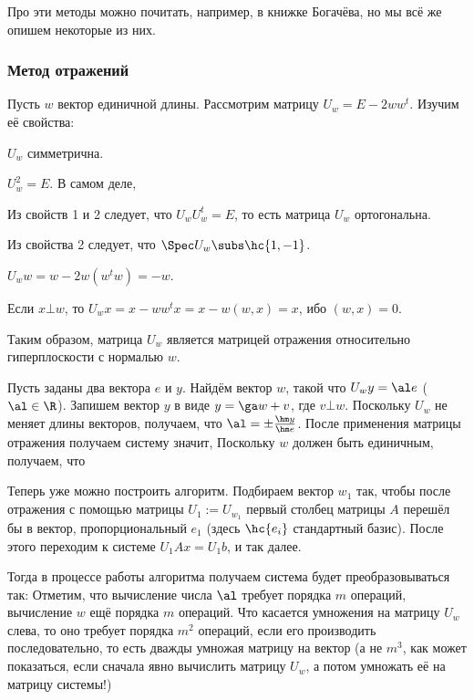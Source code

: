 \documentclass[a4paper]{article}
\begin{document}
Про эти методы можно почитать, например, в книжке Богачёва, но мы всё
же опишем некоторые из них.


\subsubsection{Метод отражений}

Пусть $w$ вектор единичной длины. Рассмотрим матрицу $U_w = E -
2ww^t$.  Изучим её свойства:
\begin{nums}{-2}
\item $U_w$ симметрична.
\item $U_w^2 = E$. В самом деле, 
\item Из свойств 1 и 2 следует, что $U_w U_w^t = E$, то есть матрица
  $U_w$ ортогональна.
\item Из свойства 2 следует, что $\Spec U_w \subs \hc{1, -1}$.
\item $U_w w = w - 2 w(w^t w) = - w$.
\item Если $x \bot w$, то $U_w x = x - w w^t x = x - w (w,x) = x$, ибо
  $(w,x) = 0$.
\end{nums}

Таким образом, матрица $U_w$ является матрицей отражения относительно
гиперплоскости с нормалью $w$.

Пусть заданы два вектора $e$ и $y$. Найдём вектор $w$, такой что $U_w
y = \al e$ ($\al \in \R$).  Запишем вектор $y$ в виде $y = \ga w + v$,
где $v \bot w$. Поскольку $U_w$ не меняет длины векторов, получаем,
что $\al = \pm\frac{\hm y}{\hm e}$.  После применения матрицы
отражения получаем систему  значит,   Поскольку $w$ должен
быть единичным, получаем, что 

Теперь уже можно построить алгоритм. Подбираем вектор $w_1$ так, чтобы
после отражения с помощью матрицы $U_1 := U_{w_1}$ первый столбец
матрицы $A$ перешёл бы в вектор, пропорциональный $e_1$ (здесь
$\hc{e_i}$ стандартный базис).  После этого переходим к системе $U_1 A
x = U_1b$, и так далее.

Тогда в процессе работы алгоритма получаем система будет
преобразовываться так:   Отметим, что вычисление числа $\al$
требует порядка $m$ операций, вычисление $w$ ещё порядка $m$ операций.
Что касается умножения на матрицу $U_w$ слева, то оно требует порядка
$m^2$ операций, если его производить последовательно, то есть дважды
умножая матрицу на вектор (а не $m^3$, как может показаться, если
сначала явно вычислить матрицу $U_w$, а потом умножать её на матрицу
системы!)
\end{document}
